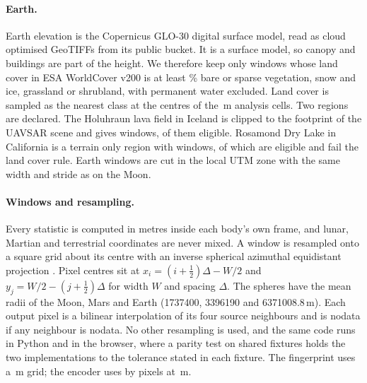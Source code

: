 \paragraph{Earth.} Earth elevation is the Copernicus GLO-30 digital surface model, read as cloud
optimised GeoTIFFs from its public bucket. It is a surface model, so canopy and buildings are part
of the height. We therefore keep only windows whose land cover in ESA WorldCover v200
\citep{zanaga2022} is at least \ConfigMinAllowedPct\% bare or sparse vegetation, snow and ice,
grassland or shrubland, with permanent water excluded. Land cover is sampled as the nearest class
at the centres of the \ConfigGridM\,m analysis cells. Two regions are declared. The Holuhraun lava
field in Iceland is clipped to the footprint of the UAVSAR scene and gives
\HoluhraunWindowsGenerated{} windows, \HoluhraunWindowsEligible{} of them eligible. Rosamond Dry
Lake in California is a terrain only region with \RosamondWindowsGenerated{} windows, of which
\RosamondWindowsEligible{} are eligible and \RosamondWindowsRejected{} fail the land cover rule.
Earth windows are cut in the local UTM zone with the same width and stride as on the Moon.

\paragraph{Windows and resampling.} Every statistic is computed in metres inside each body's own
frame, and lunar, Martian and terrestrial coordinates are never mixed. A window is resampled onto a
square grid about its centre with an inverse spherical azimuthal equidistant projection
\citep{snyder1987}. Pixel centres sit at $x_i = (i + \tfrac12)\Delta - W/2$ and
$y_j = W/2 - (j + \tfrac12)\Delta$ for width $W$ and spacing $\Delta$. The spheres have the mean
radii of the Moon, Mars and Earth (1737400, 3396190 and 6371008.8\,m). Each output
pixel is a bilinear interpolation of its four source neighbours and is nodata if any neighbour is
nodata. No other resampling is used, and the same code runs in Python and in the browser, where a
parity test on shared fixtures holds the two implementations to the tolerance stated in each
fixture. The fingerprint uses a
\ConfigGridM\,m grid; the encoder uses \ConfigInputPx{} by \ConfigInputPx{} pixels at
\ConfigInputSpacing\,m.


